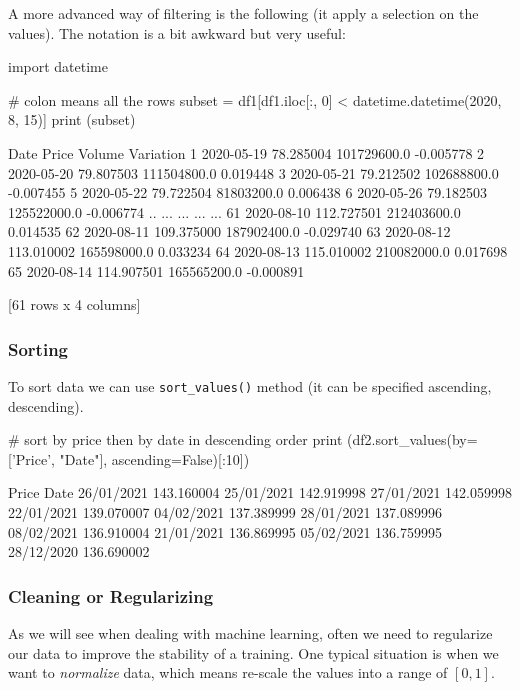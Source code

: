 A more advanced way of filtering is the following (it apply a selection on the values). The notation is a bit awkward but very useful:

\begin{ipython}
import datetime

# colon means all the rows
subset = df1[df1.iloc[:, 0] < datetime.datetime(2020, 8, 15)]
print (subset)
\end{ipython}
\begin{ioutput}
         Date       Price       Volume  Variation
1  2020-05-19   78.285004  101729600.0  -0.005778
2  2020-05-20   79.807503  111504800.0   0.019448
3  2020-05-21   79.212502  102688800.0  -0.007455
5  2020-05-22   79.722504   81803200.0   0.006438
6  2020-05-26   79.182503  125522000.0  -0.006774
..        ...         ...          ...        ...
61 2020-08-10  112.727501  212403600.0   0.014535
62 2020-08-11  109.375000  187902400.0  -0.029740
63 2020-08-12  113.010002  165598000.0   0.033234
64 2020-08-13  115.010002  210082000.0   0.017698
65 2020-08-14  114.907501  165565200.0  -0.000891

[61 rows x 4 columns]
\end{ioutput}

\subsubsection{Sorting}\label{sorting}

To sort data we can use \texttt{sort\_values()} method (it can be specified ascending, descending).

\begin{ipython}
# sort by price then by date in descending order
print (df2.sort_values(by=['Price', "Date"], ascending=False)[:10])
\end{ipython}
\begin{ioutput}
                 Price
Date                  
26/01/2021  143.160004
25/01/2021  142.919998
27/01/2021  142.059998
22/01/2021  139.070007
04/02/2021  137.389999
28/01/2021  137.089996
08/02/2021  136.910004
21/01/2021  136.869995
05/02/2021  136.759995
28/12/2020  136.690002
\end{ioutput}
        
\subsubsection{Cleaning or Regularizing}
\label{cleaning-or-regularizing}

As we will see when dealing with machine learning, often we need to regularize our data to improve the stability of a training. One typical situation is when we want to \emph{normalize} data, which means re-scale the values into a range of $[0, 1]$.

